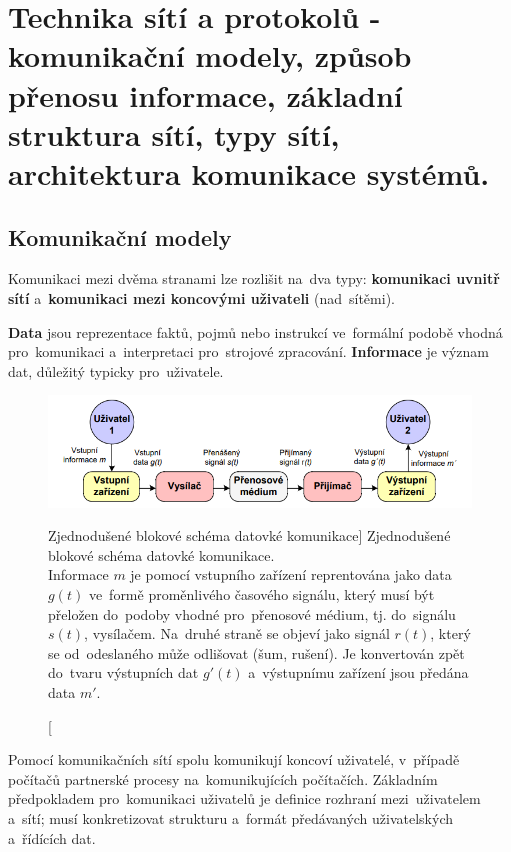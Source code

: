 \section{Technika sítí a protokolů - komunikační modely, způsob přenosu informace, základní struktura sítí, typy sítí, architektura komunikace systémů.}
\label{q01}

\subsection{Komunikační modely}

Komunikaci mezi dvěma stranami lze rozlišit na~dva typy: \textbf{komunikaci uvnitř sítí} a~\textbf{komunikaci mezi koncovými uživateli} (nad~sítěmi).

\textbf{Data} jsou reprezentace faktů, pojmů nebo instrukcí ve~formální podobě vhodná pro~komunikaci a~interpretaci pro~strojové zpracování. \textbf{Informace} je význam dat, důležitý typicky pro~uživatele.

\begin{figure}[ht]
	\centering
	\includegraphics[width=\textwidth]{images/q01_simplified_scheme_network}
	\caption
		[Zjednodušené blokové schéma datovké komunikace]
		{Zjednodušené blokové schéma datovké komunikace. \\
		Informace $m$ je pomocí vstupního zařízení reprentována jako data $g(t)$ ve~formě proměnlivého časového signálu, který musí být přeložen do~podoby vhodné pro~přenosové médium, tj. do~signálu $s(t)$, vysílačem. Na~druhé straně se objeví jako signál $r(t)$, který se od~odeslaného může odlišovat (šum, rušení). Je konvertován zpět do~tvaru výstupních dat $g'(t)$ a~výstupnímu zařízení jsou předána data $m'$.}
	\label{q01_simplified_scheme_network}
\end{figure}

Pomocí komunikačních sítí spolu komunikují koncoví uživatelé, v~případě počítačů partnerské procesy na~komunikujících počítačích. Základním předpokladem pro~komunikaci uživatelů je definice rozhraní mezi~uživatelem a~sítí; musí konkretizovat strukturu a~formát předávaných uživatelských a~řídících dat.


